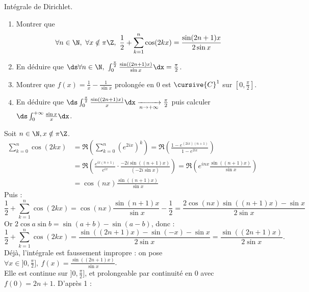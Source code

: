\documentclass[11pt]{article}
\begin{document}
\begin{ex}{Intégrale de Dirichlet.}{}
    \begin{enumerate}
        \item Montrer que
        \begin{equation*}
            \forall n \in \N, ~ \forall x \notin \pi\Z, ~ \frac{1}{2} + \sum_{k=1}^n\cos(2kx) = \frac{\sin(2n+1)x}{2\sin x}
        \end{equation*}
        \item En déduire que $\ds\forall n \in \N, ~ \int_0^{\frac{\pi}{2}}\frac{\sin((2n+1)x)}{\sin x}\dx = \frac{\pi}{2}$.
        \item Montrer que $f(x)=\frac{1}{x}-\frac{1}{\sin x}$ prolongée en 0 est $\cursive{C}^1$ sur $[0,\frac{\pi}{2}]$.
        \item En déduire que $\ds\int_0^{\frac{\pi}{2}}\frac{\sin((2n+1)x)}{x}\dx\xrightarrow[n\to+\infty]{}\frac{\pi}{2}$ puis calculer $\ds\int_0^{+\infty}\frac{\sin x}{x}\dx$.
    \end{enumerate}
    \tcblower
     Soit $n\in\N, x\notin\pi\Z$.
    \begin{align*}
        \sum_{k=0}^n \cos(2kx) &= \Re\left( \sum_{k=0}^n \left( e^{2ix} \right)^k \right) = \Re\left( \frac{1 - e^{(2ix)(n+1)}}{1-e^{2ix}} \right)\\
        &= \Re\left( \frac{e^{ix(n+1)}}{e^{ix}}\cdot\frac{-2i\sin((n+1)x)}{(-2i\sin x)} \right) = \Re\left( e^{inx}\frac{\sin((n+1)x)}{\sin x} \right)\\
        &= \cos(nx)\frac{\sin((n+1)x)}{\sin x}
    \end{align*}
    Puis :
    \begin{equation*}
        \frac{1}{2} + \sum_{k=1}^n\cos(2kx) = \cos(nx)\frac{\sin(n+1)x}{\sin x} - \frac{1}{2} = \frac{2\cos(nx)\sin((n+1)x)-\sin x}{2\sin x} 
    \end{equation*}
    Or $2\cos a\sin b = \sin(a+b) - \sin(a - b)$, donc :
    \begin{equation*}
        \frac{1}{2} + \sum_{k=1}^n\cos(2kx) = \frac{\sin((2n+1)x) - \sin(-x) - \sin x}{2\sin x} = \frac{\sin((2n+1)x)}{2\sin x}.
    \end{equation*}
     Déjà, l'intégrale est faussement impropre : on pose $\forall x \in ]0,\frac{\pi}{2}], ~ f(x)=\frac{\sin((2n+1)x)}{\sin x}$.\\
    Elle est continue sur $]0,\frac{\pi}{2}]$, et prolongeable par continuité en 0 avec $f(0)=2n+1$. D'après 1 :
    \begin{equation*}

\end{equation*}
\end{ex}
\end{document}
